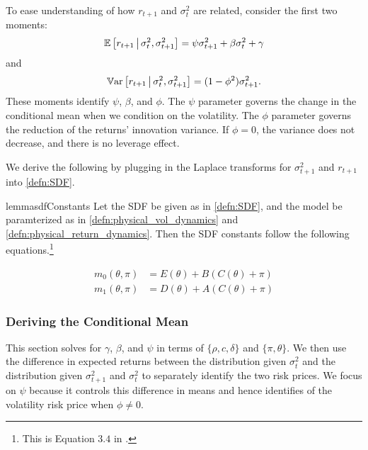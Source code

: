 \documentclass[11pt, letterpaper, twoside]{article}
\begin{document}
To ease understanding of how $r_{t+1}$ and $\sigma^2_t$ are related, consider the first two moments:
%
\begin{equation}
    \label{eqn:rtn_cond_mean}
    \operatorname{\mathbb{E}}\left[r_{t+1} \,\middle\vert\, \sigma^2_t, \sigma^2_{t+1}\right] = \psi \sigma^2_{t+1} + \beta \sigma^2_t + \gamma \\
\end{equation}
%
and
%
\begin{equation}
    \label{eqn:rtn_cond_vol}
    \operatorname{\mathbb{V}ar}\left[r_{t+1} \,\middle\vert\, \sigma^2_t, \sigma^2_{t+1}\right] = (1 - \phi^2) \sigma^2_{t+1}.
\end{equation}
%
These moments identify $\psi$, $\beta$, and $\phi$. The $\psi$ parameter governs the change in the conditional mean when we condition on the volatility. The $\phi$ parameter governs the reduction of the returns' innovation variance. If $\phi=0$, the variance does not decrease, and there is no leverage effect.  

We derive the following by plugging in the Laplace transforms for $\sigma^2_{t+1}$ and $r_{t+1}$ into \cref{defn:SDF}.

\begin{restatable}{lemma}{sdfConstants}
    \label{lemma:characterizing_sdf_integration_constants}
    Let the SDF be given as in \cref{defn:SDF}, and the model be paramterized as in \cref{defn:physical_vol_dynamics} and \cref{defn:physical_return_dynamics}.  Then the SDF constants follow the following equations.\footnote{This is Equation $3.4$ in \textcite[3.4]{han2018leverage}.}
    
    \begin{align}
        \label{eqn:sdf_functions_vs_physical_functions}
        m_0(\theta, \pi) &= E(\theta) + B(C(\theta) + \pi) \\
        m_1(\theta, \pi) &= D(\theta) + A(C(\theta) + \pi) \nonumber
    \end{align}
    
\end{restatable}


\subsubsection{Deriving the Conditional Mean}\label{sec:deriving_conditional_mean}


This section solves for $\gamma$, $\beta$, and $\psi$ in terms of $\lbrace \rho, c, \delta \rbrace$ and $\lbrace \pi, \theta \rbrace$. We then use the difference in expected returns between the distribution given $\sigma^2_t$ and the distribution given $\sigma^2_{t+1}$ and $\sigma^2_t$ to separately identify the two risk prices. We focus on $\psi$ because it controls this difference in means and hence identifies of the volatility risk price when $\phi \neq 0$.
\end{document}
